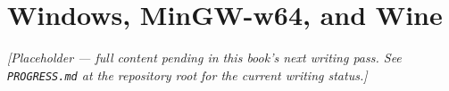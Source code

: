 \chapter{Windows, MinGW-w64, and Wine}
\label{ch:windows-wine}

\emph{[Placeholder --- full content pending in this book's next writing pass. See \texttt{PROGRESS.md} at the repository root for the current writing status.]}
